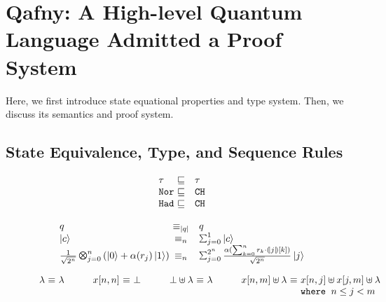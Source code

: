 \section{Qafny: A High-level Quantum Language Admitted a Proof System}
\label{sec:qafny}

Here, we first introduce \qafny state equational properties and type system. Then, we discuss its semantics and proof system.

\subsection{State Equivalence, Type, and Sequence Rules}\label{sec:state}

\begin{figure}
{\footnotesize
{\hspace*{-6em}
\begin{minipage}[t]{0.35\textwidth}
\begin{center}
 \[
  \begin{array}{l@{~}cl}
  \tau & \sqsubseteq & \tau \\
  \tnort &\sqsubseteq& \tcht\\
  \thadt &\sqsubseteq& \tcht
    \end{array}
  \]
\end{center}
  \label{fig:qafny-subtype}
\end{minipage}
\qquad
\begin{minipage}[t]{0.5\textwidth}
\begin{center}
   \[
   \begin{array}{l@{~}cl}
   q & \equiv_{\slen{q}} & q \\
  \ket{c} &\equiv_n& \sch{1}{ }{c}\\
  \shad{2^n}{n}{\alpha(r_j)} &\equiv_n& \sch{2^n}{\frac{\alpha(\sum_{k=0}^{n} r_k \cdot \tos{j}[k])}{\sqrt{2^n}}}{j}
    \end{array}
 \]
\end{center}
  \label{fig:qafny-sequiv}
\end{minipage}
\hfill{}
\begin{minipage}[t]{0.8\textwidth}
\begin{center}
 \[
  \begin{array}{l @{~} c @{~} l l@{~}c @{~} l l @{~}c @{~} l l @ {~} c @{~} l}
\lambda &\equiv & \lambda
&
\qquad
x[n,n] & \equiv & \bot
&
\qquad
\bot \uplus \lambda & \equiv & \lambda
&
\qquad
x[n,m]\uplus\lambda & \equiv & x[n,j]\uplus x[j,m] \uplus\lambda
\\
&&&&&&&&&&&
\texttt{where}\;\;n \le j < m


\end{array}\]
\end{center}
\end{minipage}}}
\end{figure}
